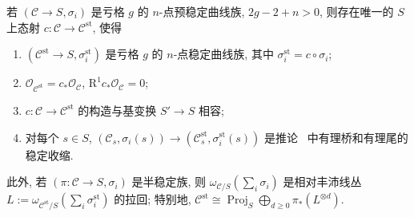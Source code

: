 \begin{theorem}[预稳定族的稳定收缩]\label{src:6.6.6}
若 $(\mathcal C\to\allowbreak S,\allowbreak \sigma_i)$ 是亏格 $g$ 的 $n$-点预稳定曲线族, $2g-2+n>0$, 则存在唯一的 $S$ 上态射 $c:\mathcal C\to\mathcal C^{\mathrm{st}}$, 使得
\begin{enumerate}[(1)]
\item $(\mathcal C^{\mathrm{st}}\to\allowbreak S,\allowbreak \sigma_i^{\mathrm{st}})$ 是亏格 $g$ 的 $n$-点稳定曲线族, 其中 $\sigma_i^{\mathrm{st}}=c\circ\sigma_i$;
\item $\mathcal O_{\mathcal C^{\mathrm{st}}}=c_*\mathcal O_{\mathcal C}$, $\mathrm R^1c_*\mathcal O_{\mathcal C}=0$;
\item $c:\mathcal C\to\mathcal C^{\mathrm{st}}$ 的构造与基变换 $S'\to\allowbreak S$ 相容;
\item 对每个 $s\in S$, $(\mathcal C_s,\allowbreak \sigma_i(s))\to(\mathcal C_s^{\mathrm{st}},\allowbreak \sigma_i^{\mathrm{st}}(s))$ 是推论~ 中有理桥和有理尾的稳定收缩.
\end{enumerate}
此外, 若 $(\pi:\mathcal C\to\allowbreak S,\allowbreak \sigma_i)$ 是半稳定族, 则 $\omega_{\mathcal C/S}(\sum_i\sigma_i)$ 是相对丰沛线丛 $L:=\omega_{\mathcal C^{\mathrm{st}}/S}(\sum_i\sigma_i^{\mathrm{st}})$ 的拉回; 特别地, $\mathcal C^{\mathrm{st}}\cong\operatorname{Proj}_S\bigoplus_{d\geq0}\pi_*(L^{\otimes d})$.
\end{theorem}
